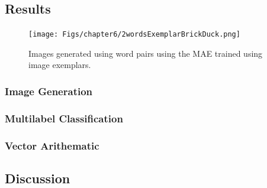 \subsection{Results}

\begin{figure}[ht]
    \centering
    \texttt{[image: Figs/chapter6/2wordsExemplarBrickDuck.png]}
    \caption{Images generated using word pairs using the MAE trained using image exemplars.}
    \label{fig:AvgBrickDuck}
\end{figure}

\subsubsection{Image Generation}
\subsubsection{Multilabel Classification}
\subsubsection{Vector Arithematic}

\subsection{Discussion}

